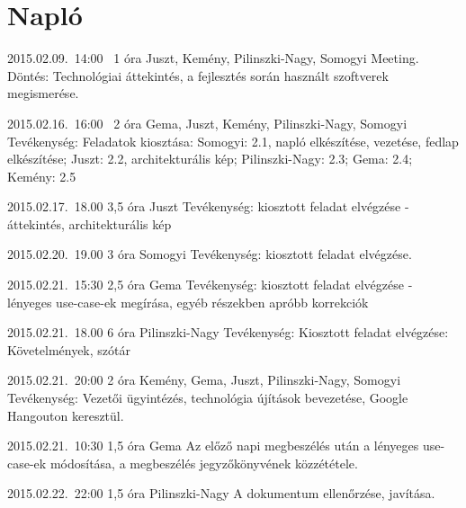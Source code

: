 %
\section{Napló}

\begin{naplo}

\bejegyzes
{2015.02.09.~14:00~} %
{1 óra} %
{Juszt, Kemény, Pilinszki-Nagy, Somogyi} %
{Meeting. Döntés: Technológiai áttekintés, a fejlesztés során használt szoftverek megismerése.} %

\bejegyzes
{2015.02.16.~16:00~}
{2 óra}
{Gema, Juszt, Kemény, Pilinszki-Nagy, Somogyi} %
{Tevékenység: Feladatok kiosztása: Somogyi: 2.1, napló elkészítése, vezetése, fedlap elkészítése; Juszt: 2.2, architekturális kép; Pilinszki-Nagy: 2.3; Gema: 2.4; Kemény: 2.5}

\bejegyzes
{2015.02.17.~18.00}
{3,5 óra}
{Juszt}
{Tevékenység: kiosztott feladat elvégzése - áttekintés, architekturális kép}

\bejegyzes
{2015.02.20.~19.00}
{3 óra}
{Somogyi}
{Tevékenység: kiosztott feladat elvégzése.}

\bejegyzes
{2015.02.21.~15:30}
{2,5 óra}
{Gema}
{Tevékenység: kiosztott feladat elvégzése - lényeges use-case-ek megírása, egyéb részekben apróbb korrekciók}

\bejegyzes
{2015.02.21.~18.00}
{6 óra}
{Pilinszki-Nagy}
{Tevékenység: \newline Kiosztott feladat elvégzése: Követelmények, szótár}

\bejegyzes
{2015.02.21.~20:00}
{2 óra}
{Kemény, Gema, Juszt, Pilinszki-Nagy, Somogyi}
{Tevékenység: Vezetői ügyintézés, technológia újítások bevezetése, Google Hangouton keresztül.}

\bejegyzes
{2015.02.21.~10:30}
{1,5 óra}
{Gema}
{Az előző napi megbeszélés után a lényeges use-case-ek módosítása, a megbeszélés jegyzőkönyvének közzététele.}

\bejegyzes
{2015.02.22.~22:00}
{1,5 óra}
{Pilinszki-Nagy}
{A dokumentum ellenőrzése, javítása.}


\end{naplo}

